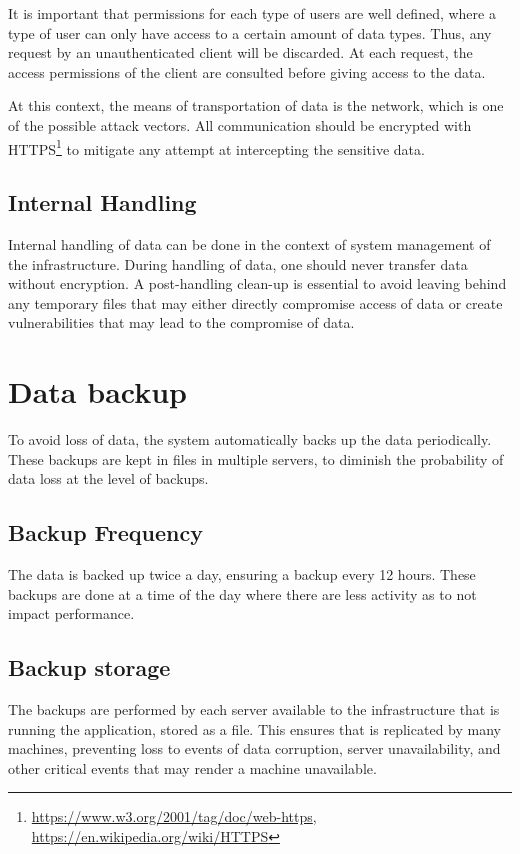 \documentclass{article}
\begin{document}
It is important that permissions for each type of users are well defined, where a type of user can only have access to a certain amount of data types. Thus, any request by an unauthenticated client will be discarded. At each request, the access permissions of the client are consulted before giving access to the data.

At this context, the means of transportation of data is the network, which is one of the possible attack vectors. All communication should be encrypted with HTTPS\footnote{\url{https://www.w3.org/2001/tag/doc/web-https}, \url{https://en.wikipedia.org/wiki/HTTPS}} to mitigate any attempt at intercepting the sensitive data.

\subsection{Internal Handling}

Internal handling of data can be done in the context of system management of the infrastructure. During handling of data, one should never transfer data without encryption. A post-handling clean-up is essential to avoid leaving behind any temporary files that may either directly compromise access of data or create vulnerabilities that may lead to the compromise of data.

\section{Data backup}

To avoid loss of data, the system automatically backs up the data periodically. These backups are kept in files in multiple servers, to diminish the probability of data loss at the level of backups.

\subsection{Backup Frequency}

The data is backed up twice a day, ensuring a backup every 12 hours. These backups are done at a time of the day where there are less activity as to not impact performance.

\subsection{Backup storage}

The backups are performed by each server available to the infrastructure that is running the application, stored as a file. This ensures that is replicated by many machines, preventing loss to events of data corruption, server unavailability, and other critical events that may render a machine unavailable.
\end{document}
